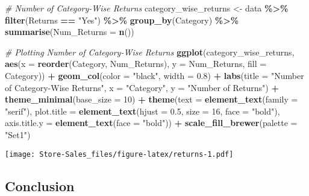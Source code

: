 \documentclass[
]{article}
\newenvironment{Shaded}{\begin{snugshade}}{\end{snugshade}}
\newcommand{\AttributeTok}[1]{\textcolor[rgb]{0.13,0.29,0.53}{#1}}
\newcommand{\CommentTok}[1]{\textcolor[rgb]{0.56,0.35,0.01}{\textit{#1}}}
\newcommand{\DecValTok}[1]{\textcolor[rgb]{0.00,0.00,0.81}{#1}}
\newcommand{\FloatTok}[1]{\textcolor[rgb]{0.00,0.00,0.81}{#1}}
\newcommand{\FunctionTok}[1]{\textcolor[rgb]{0.13,0.29,0.53}{\textbf{#1}}}
\newcommand{\NormalTok}[1]{#1}
\newcommand{\OtherTok}[1]{\textcolor[rgb]{0.56,0.35,0.01}{#1}}
\newcommand{\SpecialCharTok}[1]{\textcolor[rgb]{0.81,0.36,0.00}{\textbf{#1}}}
\newcommand{\StringTok}[1]{\textcolor[rgb]{0.31,0.60,0.02}{#1}}
\begin{document}
\begin{Shaded}
\begin{Highlighting}[]
\CommentTok{\# Number of Category{-}Wise Returns}
\NormalTok{category\_wise\_returns }\OtherTok{\textless{}{-}}\NormalTok{ data }\SpecialCharTok{\%\textgreater{}\%}
  \FunctionTok{filter}\NormalTok{(Returns }\SpecialCharTok{==} \StringTok{"Yes"}\NormalTok{) }\SpecialCharTok{\%\textgreater{}\%}
  \FunctionTok{group\_by}\NormalTok{(Category) }\SpecialCharTok{\%\textgreater{}\%}
  \FunctionTok{summarise}\NormalTok{(}\AttributeTok{Num\_Returns =} \FunctionTok{n}\NormalTok{())}

\CommentTok{\# Plotting Number of Category{-}Wise Returns}
\FunctionTok{ggplot}\NormalTok{(category\_wise\_returns, }\FunctionTok{aes}\NormalTok{(}\AttributeTok{x =} \FunctionTok{reorder}\NormalTok{(Category, Num\_Returns), }\AttributeTok{y =}\NormalTok{ Num\_Returns, }\AttributeTok{fill =}\NormalTok{ Category)) }\SpecialCharTok{+}
  \FunctionTok{geom\_col}\NormalTok{(}\AttributeTok{color =} \StringTok{"black"}\NormalTok{, }\AttributeTok{width =} \FloatTok{0.8}\NormalTok{) }\SpecialCharTok{+}
  \FunctionTok{labs}\NormalTok{(}\AttributeTok{title =} \StringTok{"Number of Category{-}Wise Returns"}\NormalTok{, }\AttributeTok{x =} \StringTok{"Category"}\NormalTok{, }\AttributeTok{y =} \StringTok{"Number of Returns"}\NormalTok{) }\SpecialCharTok{+}
  \FunctionTok{theme\_minimal}\NormalTok{(}\AttributeTok{base\_size =} \DecValTok{10}\NormalTok{) }\SpecialCharTok{+}
  \FunctionTok{theme}\NormalTok{(}\AttributeTok{text =} \FunctionTok{element\_text}\NormalTok{(}\AttributeTok{family =} \StringTok{"serif"}\NormalTok{),}
        \AttributeTok{plot.title =} \FunctionTok{element\_text}\NormalTok{(}\AttributeTok{hjust =} \FloatTok{0.5}\NormalTok{, }\AttributeTok{size =} \DecValTok{16}\NormalTok{, }\AttributeTok{face =} \StringTok{"bold"}\NormalTok{),}
        \AttributeTok{axis.title.y =} \FunctionTok{element\_text}\NormalTok{(}\AttributeTok{face =} \StringTok{"bold"}\NormalTok{)) }\SpecialCharTok{+}
  \FunctionTok{scale\_fill\_brewer}\NormalTok{(}\AttributeTok{palette =} \StringTok{"Set1"}\NormalTok{)}
\end{Highlighting}
\end{Shaded}

\texttt{[image: Store-Sales\_files/figure-latex/returns-1.pdf]}

\hypertarget{conclusion}{%
\subsection{Conclusion}\label{conclusion}}
\end{document}
